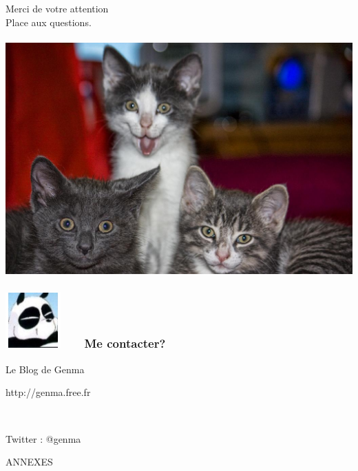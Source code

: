 \documentclass{beamer}
\begin{document}
\begin{frame}
\begin{center}
\Huge{Merci de votre attention}
\\
\Huge{Place aux questions.}
\\~\\
\includegraphics[scale=0.2] {./images/chat.jpg}
\end{center}
\end{frame}

\begin{frame}
\frametitle{\includegraphics[scale=0.4]{./images/Genma.jpg} \ \ \  Me contacter?}
\Huge{\centerline{Le Blog de Genma}}
\Huge{\centerline{http://genma.free.fr}}
\Huge{\centerline{~}}
\Huge{\centerline{Twitter : @genma}}
\end{frame}


\begin{frame}
\Huge{\centerline{ANNEXES}}
\end{frame}

\begin{frame}
\frametitle{}
\begin{block}{}
\justifying{
\begin{itemize}
\item
\item
\item
\end{itemize}
}\end{block}
\end{frame}
\end{document}
